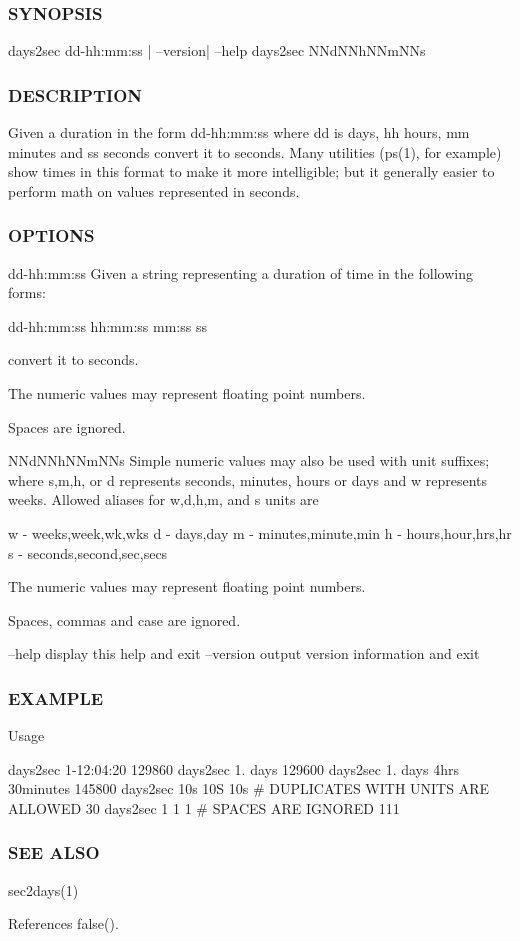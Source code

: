 \subsubsection*{S\+Y\+N\+O\+P\+S\+IS}

\begin{DoxyVerb}days2sec dd-hh:mm:ss | --version| --help
days2sec NNdNNhNNmNNs
\end{DoxyVerb}


\subsubsection*{D\+E\+S\+C\+R\+I\+P\+T\+I\+ON}

Given a duration in the form dd-\/hh\+:mm\+:ss where dd is days, hh hours, mm minutes and ss seconds convert it to seconds. Many utilities (ps(1), for example) show times in this format to make it more intelligible; but it generally easier to perform math on values represented in seconds.

\subsubsection*{O\+P\+T\+I\+O\+NS}

dd-\/hh\+:mm\+:ss Given a string representing a duration of time in the following forms\+:

dd-\/hh\+:mm\+:ss hh\+:mm\+:ss mm\+:ss ss

convert it to seconds.

The numeric values may represent floating point numbers.

Spaces are ignored.

N\+Nd\+N\+Nh\+N\+Nm\+N\+Ns Simple numeric values may also be used with unit suffixes; where s,m,h, or d represents seconds, minutes, hours or days and w represents weeks. Allowed aliases for w,d,h,m, and s units are

w -\/ weeks,week,wk,wks d -\/ days,day m -\/ minutes,minute,min h -\/ hours,hour,hrs,hr s -\/ seconds,second,sec,secs

The numeric values may represent floating point numbers.

Spaces, commas and case are ignored.

--help display this help and exit --version output version information and exit

\subsubsection*{E\+X\+A\+M\+P\+LE}

Usage

days2sec 1-\/12\+:04\+:20 129860 days2sec 1. days 129600 days2sec 1. days 4hrs 30minutes 145800 days2sec 10s 10S 10s \# D\+U\+P\+L\+I\+C\+A\+T\+ES W\+I\+TH U\+N\+I\+TS A\+RE A\+L\+L\+O\+W\+ED 30 days2sec 1 1 1 \# S\+P\+A\+C\+ES A\+RE I\+G\+N\+O\+R\+ED 111 \subsubsection*{S\+EE A\+L\+SO}

sec2days(1) 

References false().


